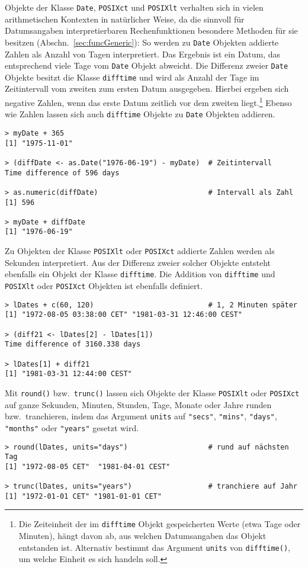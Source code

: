 Objekte der Klasse \lstinline!Date!, \lstinline!POSIXct! und \lstinline!POSIXlt! verhalten sich in vielen arithmetischen Kontexten in natürlicher Weise, da die sinnvoll für Datumsangaben interpretierbaren Rechenfunktionen besondere Methoden für sie besitzen (Abschn.\ \ref{sec:funcGeneric}): So werden zu \lstinline!Date! Objekten addierte Zahlen als Anzahl von Tagen interpretiert. Das Ergebnis ist ein Datum, das entsprechend viele Tage vom \lstinline!Date! Objekt abweicht. Die Differenz zweier \lstinline!Date! Objekte besitzt die Klasse \lstinline!difftime! und wird als Anzahl der Tage im Zeitintervall vom zweiten zum ersten Datum ausgegeben. Hierbei ergeben sich negative Zahlen, wenn das erste Datum zeitlich vor dem zweiten liegt.\footnote{Die Zeiteinheit der im \lstinline!difftime! Objekt gespeicherten Werte (etwa Tage oder Minuten), hängt davon ab, aus welchen Datumsangaben das Objekt entstanden ist. Alternativ bestimmt das Argument \lstinline!units! von \lstinline!difftime()!, um welche Einheit es sich handeln soll.} Ebenso wie Zahlen lassen sich auch \lstinline!difftime! Objekte zu \lstinline!Date! Objekten addieren.
\begin{lstlisting}
> myDate + 365
[1] "1975-11-01"

> (diffDate <- as.Date("1976-06-19") - myDate)  # Zeitintervall
Time difference of 596 days

> as.numeric(diffDate)                          # Intervall als Zahl
[1] 596

> myDate + diffDate
[1] "1976-06-19"
\end{lstlisting}

Zu Objekten der Klasse \lstinline!POSIXlt! oder \lstinline!POSIXct! addierte Zahlen werden als Sekunden interpretiert. Aus der Differenz zweier solcher Objekte entsteht ebenfalls ein Objekt der Klasse \lstinline!difftime!. Die Addition von \lstinline!difftime! und \lstinline!POSIXlt! oder \lstinline!POSIXct! Objekten ist ebenfalls definiert.
\begin{lstlisting}
> lDates + c(60, 120)                           # 1, 2 Minuten später
[1] "1972-08-05 03:38:00 CET" "1981-03-31 12:46:00 CEST"

> (diff21 <- lDates[2] - lDates[1])
Time difference of 3160.338 days

> lDates[1] + diff21
[1] "1981-03-31 12:44:00 CEST"
\end{lstlisting}

Mit \lstinline!round()! bzw.\ \lstinline!trunc()! lassen sich Objekte der Klasse \lstinline!POSIXlt! oder \lstinline!POSIXct! auf ganze Sekunden, Minuten, Stunden, Tage, Monate oder Jahre runden bzw.\ tranchieren, indem das Argument \lstinline!units! auf \lstinline!"secs"!, \lstinline!"mins"!, \lstinline!"days"!, \lstinline!"months"! oder \lstinline!"years"! gesetzt wird.
\begin{lstlisting}
> round(lDates, units="days")                   # rund auf nächsten Tag
[1] "1972-08-05 CET"  "1981-04-01 CEST"

> trunc(lDates, units="years")                  # tranchiere auf Jahr
[1] "1972-01-01 CET" "1981-01-01 CET"
\end{lstlisting}

